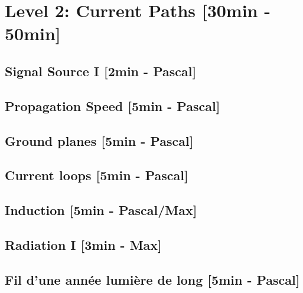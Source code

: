 
\section{Level 2: Current Paths [30min - 50min]}
\subsection{Signal Source I [2min - Pascal]}

\subsection{Propagation Speed [5min - Pascal]}


\subsection{Ground planes [5min - Pascal]}

\subsection{Current loops [5min - Pascal]}

\subsection{Induction [5min - Pascal/Max]}

\subsection{Radiation I [3min - Max]}

\subsection{Fil d'une année lumière de long [5min - Pascal]}
